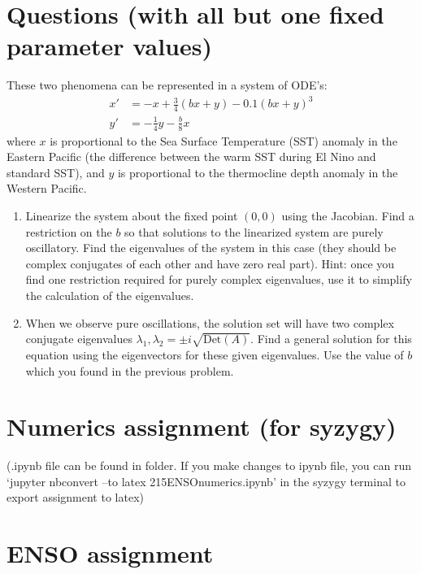 \documentclass[10pt, letterpaper, answer]{exam}
\begin{document}
\section{Questions (with all but  one fixed parameter values)}
These two phenomena can be represented in a system of ODE's:
\begin{align}
    x' & = -x + \frac{3}{4} (bx + y) - 0.1(bx + y)^3 \\
    y' & = -\frac{1}{4}y -  \frac{b}{8} x
\end{align}
where $x$ is proportional to the Sea Surface Temperature (SST) anomaly in the Eastern Pacific (the difference between the warm SST during El Nino and standard SST), and $y$ is  proportional to the thermocline depth anomaly in the Western Pacific.
\begin{enumerate}
    \item  Linearize the system about the fixed point $(0,0)$ using the Jacobian. Find a restriction on the $b$ so that solutions to the linearized system are purely oscillatory. Find the eigenvalues of the system in this case (they should be complex conjugates of each other and have zero real part). Hint: once you find one restriction required for purely complex eigenvalues, use it to simplify the calculation of the eigenvalues.

    \item When we observe pure oscillations, the solution set will have two complex conjugate eigenvalues $\lambda_1, \lambda_2 = \pm i\sqrt{\mathrm{Det}(A)}$. Find a general solution for this equation using the eigenvectors for these given eigenvalues. Use the value of $b$ which you found in the previous problem. 


\end{enumerate}




\newpage

\section{Numerics assignment (for syzygy)}
(.ipynb file can be found in folder. If you make changes to ipynb file, you can run `jupyter nbconvert --to latex 215ENSOnumerics.ipynb' in the syzygy terminal to export assignment to latex)\\


    
    \hypertarget{enso-assignment}{%
\section*{ENSO assignment}\label{enso-assignment}}
\end{document}
